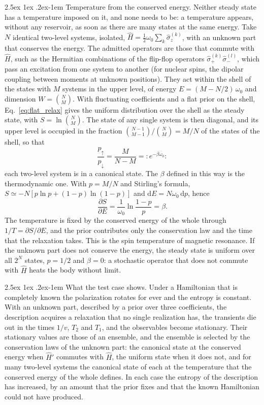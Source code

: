 \documentclass[10pt,a4paper]{article}
\makeatletter
\renewcommand{\paragraph}{\@startsection{paragraph}{4}{\z@}%
  {2.5ex \@plus 1ex \@minus .2ex}{-1em}%
  {\normalfont\fontsize{14pt}{17pt}\selectfont\bfseries}}
\newcommand{\dd}{\mathrm{d}}
\makeatother
\begin{document}
\paragraph{Temperature from the conserved energy.}
Neither steady state has a temperature imposed on it, and none needs to be: a temperature appears, without any reservoir, as soon as there are many states at the same energy.
Take $ N $ identical two-level systems, isolated, $ \hat H = \tfrac12\omega_0\sum_k\hat\sigma_z^{(k)} $, with an unknown part that conserves the energy.
The admitted operators are those that commute with $ \hat H $, such as the Hermitian combinations of the flip-flop operators $ \hat\sigma_+^{(k)}\hat\sigma_-^{(l)} $, which pass an excitation from one system to another (for nuclear spins, the dipolar coupling between moments at unknown positions).
They act within the shell of the states with $ M $ systems in the upper level, of energy $ E = (M - N/2)\,\omega_0 $ and dimension $ W = \binom{N}{M} $.
With fluctuating coefficients and a flat prior on the shell, Eq.~\eqref{eq:flat_relax} gives the uniform distribution over the shell as the steady state, with $ S = \ln\binom{N}{M} $.
The state of any single system is then diagonal, and its upper level is occupied in the fraction $ \binom{N-1}{M-1}/\binom{N}{M} = M/N $ of the states of the shell, so that
\[
  \frac{p_\uparrow}{p_\downarrow} = \frac{M}{N - M} =: e^{-\beta\omega_0} :
\]
each two-level system is in a canonical state.
The $ \beta $ defined in this way is the thermodynamic one.
With $ p = M/N $ and Stirling's formula, $ S \simeq -N[p\ln p + (1 - p)\ln(1 - p)] $ and $ \dd E = N\omega_0\,\dd p $, hence
\[
  \frac{\partial S}{\partial E} = \frac{1}{\omega_0}\ln\frac{1 - p}{p} = \beta .
\]
The temperature is fixed by the conserved energy of the whole through $ 1/T = \partial S/\partial E $, and the prior contributes only the conservation law and the time that the relaxation takes.
This is the spin temperature of magnetic resonance.
If the unknown part does not conserve the energy, the steady state is uniform over all $ 2^{N} $ states, $ p = 1/2 $ and $ \beta = 0 $: a stochastic operator that does not commute with $ \hat H $ heats the body without limit.

\paragraph{What the test case shows.}
Under a Hamiltonian that is completely known the polarization rotates for ever and the entropy is constant.
With an unknown part, described by a prior over three coefficients, the description acquires a relaxation that no single realization has, the transients die out in the times $ 1/v $, $ T_2 $ and $ T_1 $, and the observables become stationary.
Their stationary values are those of an ensemble, and the ensemble is selected by the conservation laws of the unknown part: the canonical state at the conserved energy when $ \hat H' $ commutes with $ \hat H $, the uniform state when it does not, and for many two-level systems the canonical state of each at the temperature that the conserved energy of the whole defines.
In each case the entropy of the description has increased, by an amount that the prior fixes and that the known Hamiltonian could not have produced.
\end{document}
